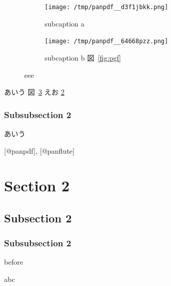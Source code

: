 \documentclass[
  a4paper,
  jafontscale=0.92,
  hanging_punctuation,
  head_space=24.8mm,
  foot_space=24.8mm]{jlreq}
\newenvironment{Shaded}{}{}
\newcommand{\NormalTok}[1]{#1}
\begin{document}
\begin{figure}
\centering
\begin{subfigure}{0.475\columnwidth}
\centering
\texttt{[image: /tmp/panpdf\_\_d3f1jbkk.png]}
\caption{subcaption a}\label{fig:png}
\end{subfigure}
\begin{subfigure}{0.475\columnwidth}
\centering
\texttt{[image: /tmp/panpdf\_\_64668pzz.png]}
\caption{subcaption b 図~\ref{fig:pgf}}\label{fig:png}
\end{subfigure}
\caption{eee}\label{fig:xxx}
\end{figure}

あいう 図~\ref{fig:xxx}
えお \ref{fig:png}

\subsubsection{Subsubsection 2}\label{subsubsection-2}

あいう

{[}@panpdf{]}, {[}@panflute{]}

\section{Section 2}\label{sec:2}

\subsection{Subsection 2}\label{subsection-2}

\subsubsection{Subsubsection 2}\label{subsubsection-2-1}

before


\begin{Shaded}
\begin{Highlighting}[]
\NormalTok{abc}
\end{Highlighting}
\end{Shaded}

\vspace{-0.5\baselineskip}

\end{document}
